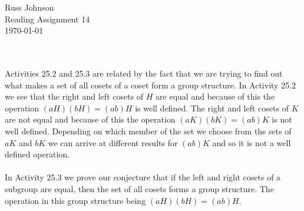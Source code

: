 \documentclass[11pt,a4paper]{article}
\begin{document}
\begin{flushright}
Russ Johnson\\
Reading Assignment 14\\
\today\\
\end{flushright}
~\\
~\\
Activities 25.2 and 25.3 are related by the fact that we are trying to find out what makes a set of all cosets of a coset form a group structure.  In Activity 25.2 we see that the right and left cosets of $H$ are equal and because of this the operation $(aH)(bH) = (ab)H$ is well defined. The right and left cosets of $K$ are not equal and because of this the operation $(aK)(bK) = (ab)K$ is not well defined. Depending on which member of the set we choose from the sets of $aK$ and $bK$ we can arrive at different results for $(ab)K$ and so it is not a well defined operation.\\
~\\
In Activity 25.3 we prove our conjecture that if the left and right cosets of a subgroup are equal, then the set of all cosets forms a group structure. The operation in this group structure being $(aH)(bH) = (ab)H$.
\end{document}

